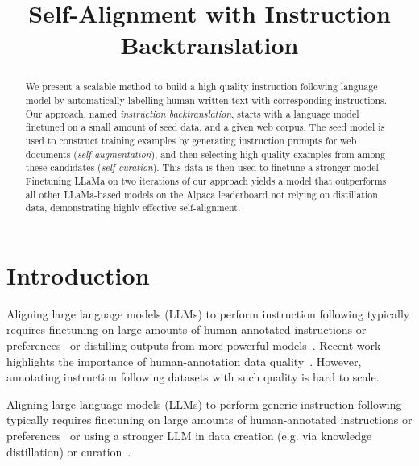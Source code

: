 \title{Self-Alignment with Instruction Backtranslation}



\maketitle

\begin{abstract}
We present a scalable method to build a high quality instruction following language model by automatically labelling human-written text with corresponding instructions. Our approach, named {\em instruction backtranslation}, starts with a language model finetuned on a small amount of seed data, and a given web corpus. The seed model is used to construct training examples by generating instruction prompts for web documents ({\em self-augmentation}), and then  selecting high quality examples from among these candidates ({\em self-curation}).  This data is then used to finetune a stronger model.  Finetuning LLaMa on two iterations of our approach yields a model that outperforms all other LLaMa-based models on the Alpaca leaderboard not relying on distillation data, demonstrating highly effective self-alignment.

\end{abstract}

\section{Introduction}

Aligning large language models (LLMs) to perform instruction following typically requires finetuning on large amounts of human-annotated instructions or preferences~\citep{ouyang2022training,touvron2023llama, bai2022training}  or distilling outputs from more powerful models~\citep{wang2022self,honovich2022unnatural,alpaca,vicuna2023,peng2023instruction,xu2023wizardlm}.
Recent work highlights the importance of human-annotation data quality~\citep{zhou2023lima,kopf2023openassistant}. However, annotating instruction following datasets with such quality is hard to scale. 

Aligning large language models (LLMs) to perform generic instruction following typically requires finetuning on large amounts of human-annotated instructions or preferences~\citep{ouyang2022training,touvron2023llama, bai2022training} or using a stronger LLM in data creation (e.g. via knowledge distillation) or curation~\citep{wang2022self,honovich2022unnatural,alpaca,vicuna2023,peng2023instruction,xu2023wizardlm}.
 
